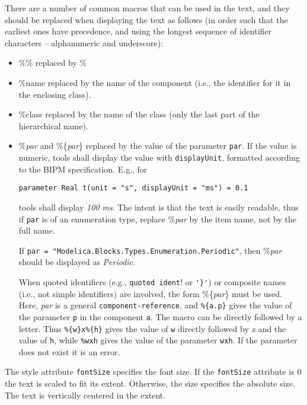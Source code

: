 There are a number of common macros that can be used in the text, and they should be replaced when displaying the text as follows (in order such that the earliest ones have precedence, and using the longest sequence of identifier characters -- alphanumeric and underscore):
\begin{itemize}
\item
  \%\% replaced by \%
\item
  \%name replaced by the name of the component (i.e., the identifier for it in the enclosing class).
\item
  \%class replaced by the name of the class (only the last part of the hierarchical name).
\item
  \%\emph{par} and \%\{\emph{par}\} replaced by the value of the parameter \lstinline!par!.
  If the value is numeric, tools shall display the value with \lstinline!displayUnit!, formatted according to the BIPM specification.
  E.g., for
\begin{lstlisting}[language=modelica]
parameter Real t(unit = "s", displayUnit = "ms") = 0.1
\end{lstlisting}
  tools shall display \emph{100 ms}.
  The intent is that the text is easily readable, thus if \lstinline!par! is of an enumeration type, replace \%\emph{par} by the item name, not by the full name.
  \begin{example}
  If \lstinline!par = "Modelica.Blocks.Types.Enumeration.Periodic"!, then \%\emph{par} should be displayed as \emph{Periodic}.
  \end{example}
  When quoted identifiers (e.g., \lstinline'quoted ident'! or \lstinline!'}'!) or composite names (i.e., not simple identifiers) are involved, the form \%\{\emph{par}\} must be used.
  Here, \emph{par} is a general \lstinline[language=grammar]!component-reference!, and \lstinline!%{a.p}! gives the value of the parameter \lstinline!p! in the component \lstinline!a!.
  The macro can be directly followed by a letter.
  Thus \lstinline!%{w}x%{h}! gives the value of \lstinline!w! directly followed by \emph{x} and the value of \lstinline!h!, while \lstinline!%wxh! gives the value of the parameter \lstinline!wxh!.
  If the parameter does not exist it is an error.
\end{itemize}

The style attribute \lstinline!fontSize! specifies the font size.
If the \lstinline!fontSize! attribute is 0 the text is scaled to fit its extent.
Otherwise, the size specifies the absolute size.
The text is vertically centered in the extent.

